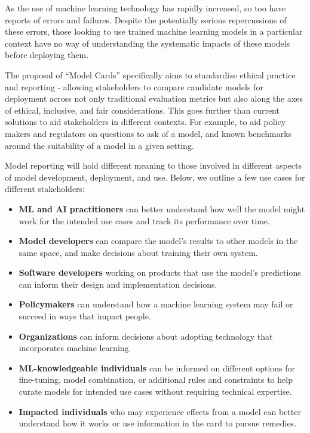 \documentclass[format=sigconf]{acmart}
\begin{document}
As the use of machine learning technology has rapidly increased, so too have reports of errors and failures. 
Despite the potentially serious repercussions of these errors, those looking to use trained machine learning models in a particular context have no way of understanding the systematic impacts of these models before deploying them.

The proposal of ``Model Cards'' specifically aims to standardize ethical practice and reporting - allowing stakeholders to compare candidate models for deployment across not only traditional evaluation metrics but also along the axes of ethical, inclusive, and fair considerations. This goes further than current solutions to aid stakeholders in different contexts.  For example, to aid policy makers and regulators on questions to ask of a model, and known benchmarks around the suitability of a model in a given setting. 

Model reporting will hold different meaning to those involved in different aspects of model development, deployment, and use.  Below, we outline a few use cases for different stakeholders:
\begin{itemize}
 \item {\bf ML and AI practitioners} can better understand how well the model might work for the intended use cases and track its performance over time.
\item {\bf Model developers} can compare the model's results to other models in the same space, and make decisions about training their own system.
\item {\bf Software developers} working on products that use the model's predictions can inform their design and implementation decisions.
\item {\bf Policymakers} can understand how a machine learning system may fail or succeed in ways that impact people.
\item {\bf Organizations} can inform decisions about adopting technology that incorporates machine learning.
\item {\bf ML-knowledgeable individuals} can be informed on different options for fine-tuning, model combination, or additional rules and constraints to help curate models for intended use cases without requiring technical expertise. 
\item {\bf Impacted individuals} who may experience effects from a model can better understand how it works or use information in the card to pursue remedies.
\end{itemize}
\end{document}
